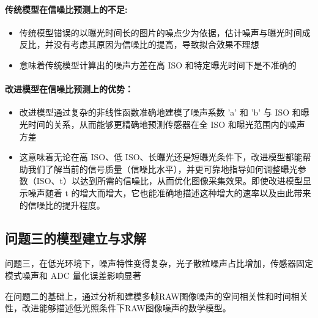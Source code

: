 \documentclass[a4paper]{article}
\begin{document}
	\paragraph{传统模型在信噪比预测上的不足:}
	\begin{itemize}
		\item 传统模型错误的以曝光时间长的图片的噪点少为依据，估计噪声与曝光时间成反比，并没有考虑其原因为信噪比的提高，导致拟合效果不理想
		\item 意味着传统模型计算出的噪声方差在高 ISO 和特定曝光时间下是不准确的
	\end{itemize}
	\paragraph{改进模型在信噪比预测上的优势：}
	\begin{itemize}
		\item 改进模型通过复杂的非线性函数准确地建模了噪声系数 'a' 和 'b' 与 ISO 和曝光时间的关系，从而能够更精确地预测传感器在全 ISO 和曝光范围内的噪声方差
		\item 这意味着无论在高 ISO、低 ISO、长曝光还是短曝光条件下，改进模型都能帮助我们了解当前的信号质量（信噪比水平），并更可靠地指导如何调整曝光参数（ISO、t）以达到所需的信噪比，从而优化图像采集效果。即使改进模型显示噪声随着 t 的增大而增大，它也能准确地描述这种增大的速率以及由此带来的信噪比的提升程度。
	\end{itemize}
	\subsection{问题三的模型建立与求解}
	
	问题三，在低光环境下，噪声特性变得复杂，光子散粒噪声占比增加，传感器固定模式噪声和 ADC 量化误差影响显著\par
	在问题二的基础上，通过分析和建模多帧RAW图像噪声的空间相关性和时间相关性，改进能够描述低光照条件下RAW图像噪声的数学模型。\par
\end{document}
